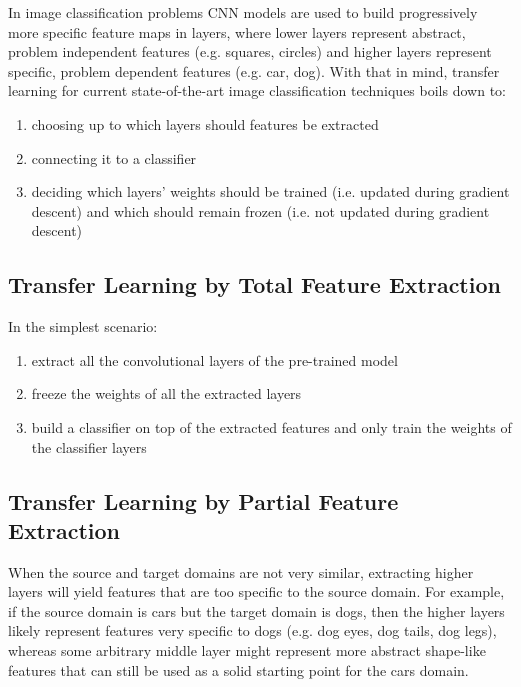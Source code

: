 
In image classification problems \ac{CNN} models are used to build progressively more specific feature maps in layers, where lower layers represent abstract, problem independent features (e.g. squares, circles) and higher layers represent specific, problem dependent features (e.g. car, dog). With that in mind, transfer learning for current state-of-the-art image classification techniques boils down to:

\begin{enumerate}
    \item choosing up to which layers should features be extracted
    \item connecting it to a classifier
    \item deciding which layers' weights should be trained (i.e. updated during gradient descent) and which should remain frozen (i.e. not updated during gradient descent)
\end{enumerate}

\subsection{Transfer Learning by Total Feature Extraction}

In the simplest scenario:

\begin{enumerate}
    \item extract all the convolutional layers of the pre-trained model
    \item freeze the weights of all the extracted layers
    \item build a classifier on top of the extracted features and only train the weights of the classifier layers
\end{enumerate}

\subsection{Transfer Learning by Partial Feature Extraction}

When the source and target domains are not very similar, extracting higher layers will yield features that are too specific to the source domain. For example, if the source domain is cars but the target domain is dogs, then the higher layers likely represent features very specific to dogs (e.g. dog eyes, dog tails, dog legs), whereas some arbitrary middle layer might represent more abstract shape-like features that can still be used as a solid starting point for the cars domain.

